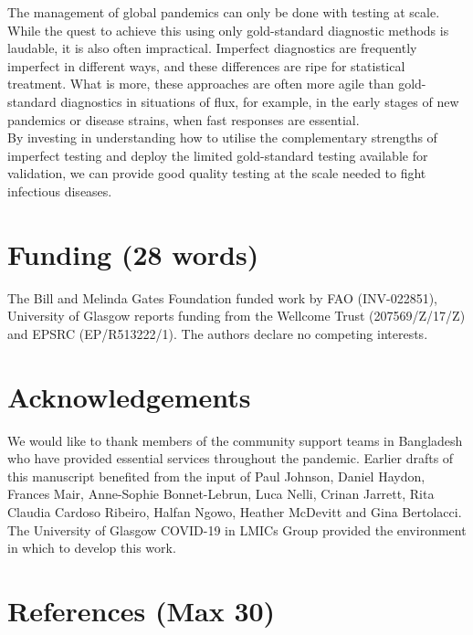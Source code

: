 \documentclass[]{elsarticle} %
\begin{document}
The management of global pandemics can only be done with testing at scale.
While the quest to achieve this using only gold-standard diagnostic methods is laudable, it is also often impractical.
Imperfect diagnostics are frequently imperfect in different ways, and these differences are ripe for statistical treatment.
What is more, these approaches are often more agile than gold-standard diagnostics in situations of flux, for example, in the early stages of new pandemics or disease strains, when fast responses are essential.\\
By investing in understanding how to utilise the complementary strengths of imperfect testing and deploy the limited gold-standard testing available for validation, we can provide good quality testing at the scale needed to fight infectious diseases.

\hypertarget{funding-28-words}{%
\section{Funding (28 words)}\label{funding-28-words}}

The Bill and Melinda Gates Foundation funded work by FAO (INV-022851), University of Glasgow reports funding from the Wellcome Trust (207569/Z/17/Z) and EPSRC (EP/R513222/1).
The authors declare no competing interests.

\hypertarget{acknowledgements}{%
\section{Acknowledgements}\label{acknowledgements}}

We would like to thank members of the community support teams in Bangladesh who have provided essential services throughout the pandemic.
Earlier drafts of this manuscript benefited from the input of Paul Johnson, Daniel Haydon, Frances Mair, Anne-Sophie Bonnet-Lebrun, Luca Nelli, Crinan Jarrett, Rita Claudia Cardoso Ribeiro, Halfan Ngowo, Heather McDevitt and Gina Bertolacci.
The University of Glasgow COVID-19 in LMICs Group provided the environment in which to develop this work.

\hypertarget{references-max-30}{%
\section*{References (Max 30)}\label{references-max-30}}
\end{document}
